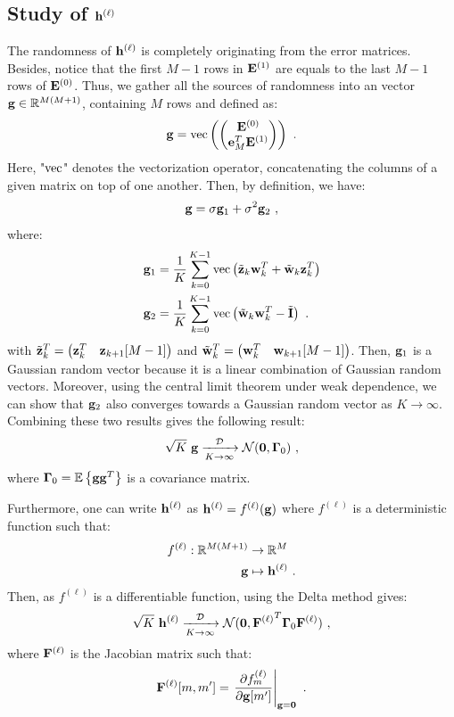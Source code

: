 \documentclass[journal,onecolumn]{IEEEtran}
\begin{document}
\subsection{Study of $\bh^{(\ell)}$}
The randomness of $\bh^{(\ell)}$ is completely originating from the error matrices. Besides, notice that the first $M-1$ rows in $\bE^{(1)}$ are equals to the last $M-1$ rows of $\bE^{(0)}$. Thus, we gather all the sources of randomness into an vector $\bg\in\RR^{M(M+1)}$, containing $M$ rows and defined as:
\[
\bg = \vec\left(
\begin{pmatrix}
\bE^{(0)} \\
\be_M^T\bE^{(1)}
\end{pmatrix}
\right)\ .
\]
Here, "$\vec$" denotes the vectorization operator, concatenating the columns of a given matrix on top of one another. Then, by definition, we have:
\[
\bg = \sigma\bg_1 + \sigma^2\bg_2\ ,
\]
where:
\begin{align*}
\bg_1 &= \dfrac1K\sum_{k=0}^{K-1}\vec\left( \tilde\bz_k\bw_k^T + \tilde\bw_k\bz_k^T \right) \\
\bg_2 &= \dfrac1K\sum_{k=0}^{K-1}\vec\left(\tilde\bw_k\bw_k^T-\tilde\bI \right) \ .
\end{align*}
with $\tilde\bz_k^T= \begin{pmatrix} \bz_k^T & \bz_{k+1}[M-1] \end{pmatrix}$ and $\tilde\bw_k^T= \begin{pmatrix} \bw_k^T & \bw_{k+1}[M-1] \end{pmatrix}$. Then, $\bg_1$ is a Gaussian random vector because it is a linear combination of Gaussian random vectors. Moreover, using the central limit theorem under weak dependence, we can show that $\bg_2$ also converges towards a Gaussian random vector as $K\to\infty$. Combining these two results gives the following result:
\[
\sqrt{K}\ \bg \xrightarrow[K\to\infty]{\cD} \cN(\bzero,\bGamma_0)\ ,
\]
where $\bGamma_0=\EE\left\{\bg\bg^T\right\}$ is a covariance matrix.

Furthermore, one can write $\bh^{(\ell)}$ as $\bh^{(\ell)}=f^{(\ell)}(\bg)$ where $f^{(\ell)}$ is a deterministic function such that:
\begin{align*}
f^{(\ell)} : \RR^{M(M+1)} &\to \RR^{M} \\
 \bg &\mapsto \bh^{(\ell)}\ . \\
\end{align*}
Then, as $f^{(\ell)}$ is a differentiable function, using the Delta method gives:
\begin{align*}
\sqrt{K}\ \bh^{(\ell)} \xrightarrow[K\to\infty]{\cD} \cN(\bzero,{\bF^{(\ell)}}^T\bGamma_0\bF^{(\ell)})\ ,
\end{align*}
where $\bF^{(\ell)}$ is the Jacobian matrix such that:
\[
\bF^{(\ell)}[m,m'] = \left.\dfrac{\partial f^{(\ell)}_m}{\partial\bg[m']}\right\vert_{\bg=\bzero}\ .
\]
\end{document}
